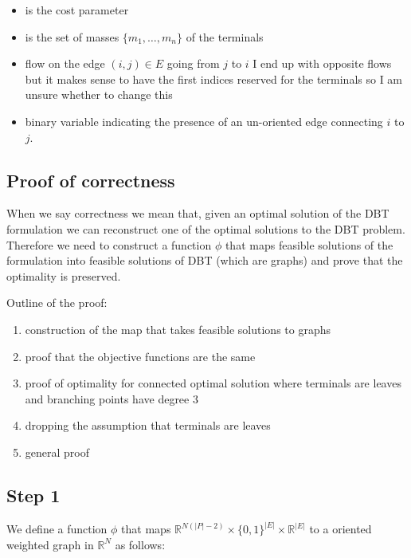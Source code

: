 \documentclass[11pt,reqno,a4paper]{amsart}
\newenvironment{itemizeb}
{\begin{itemize}
     \itemsep=2pt}{
\end{itemize}}
\numberwithin{equation}{section}
\theoremstyle{mytheorem}
\theoremstyle{myremark}
\theoremstyle{myparagraph}
\newcommand{\R}{\mathbb{R}}
\begin{document}
    \begin{itemizeb}
         cm=.3 cm
        \item[$\alpha \in (0,1)$] is the cost parameter
        \item [$M$] is the set of masses $\{m_1, \ldots, m_n\}$ of the terminals
        \item [$f_{ij}$] flow on the edge $(i, j) \in E$ going from $j$ to $i$  {\color{red} I end up with opposite flows but it makes sense to have the first indices
        reserved for the terminals so I am unsure whether to change this}
        \item [$y_{ij}$] binary variable indicating the presence of an un-oriented edge connecting $i$ to $j$.
    \end{itemizeb}

    \subsection{Proof of correctness}

    When we say correctness we mean that, given an optimal solution of the DBT formulation we can reconstruct one of the optimal solutions
    to the DBT problem.
    Therefore we need to construct a function $\phi$ that maps feasible solutions of the formulation into feasible solutions of DBT (which are graphs)
    and prove that the optimality is preserved.

    Outline of the proof:
    \begin{enumerate}
        \item construction of the map that takes feasible solutions to graphs
        \item proof that the objective functions are the same
        \item proof of optimality for connected optimal solution where terminals are leaves and branching points have degree 3
        \item dropping the assumption that terminals are leaves
        \item general proof
    \end{enumerate}

    \subsection{Step 1}
    We define a function $\phi$ that maps $\mathbb{R}^{N (|P|-2)} \times \{0,1\}^{|E|} \times \R^{|E|}$ to a oriented weighted graph in $\mathbb{R}^N$ as follows:
\end{document}
